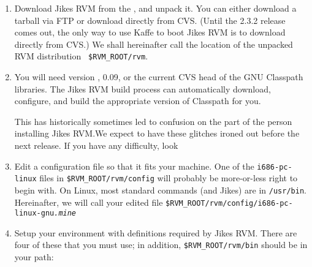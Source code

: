 \begin{enumerate}
We have had mixed experiences with different releases of the Jikes
compiler. Versions 1.13 and 1.18 are known to work for building Jikes
RVM. Versions 1.14 through 1.17 and 1.20 are known to {\em not}\/
work. Version 1.19 has worked for many people, but we have had
problems reported on OSX. 


\begin{small}
{\tt jikes-1.15} in
particular --- installed by default with SuSE Linux 8.1 --- has a
byte-code generation bug that will cause Jikes RVM to crash with an
{\tt ArrayIndexOutOfBounds} exception.  {\tt jikes-1.13}, as of the last
time we tried it (August 8, 2003) works fine, and sometimes generates
better error messages than {\tt jikes-1.18}.
\end{small}

\item Download Jikes RVM from the , and unpack it.   You can either
  download a tarball via FTP or download directly from CVS.  (Until
  the 2.3.2 release comes out, the only way to use Kaffe to boot Jikes
  RVM is to download directly from CVS.)  We shall
hereinafter call the location of the unpacked RVM distribution {\tt
  \$RVM\_\-ROOT\-/\-rvm}.   


%
%
\item You will need version \classpathversion{}, 0.09, or the current
  CVS head of the GNU Classpath
libraries.  The Jikes RVM build process can automatically download, 
configure, and build the appropriate version of Classpath for you.

This has historically sometimes led to confusion on the part of the
person installing Jikes RVM.\@  We expect to have these glitches ironed
out before the next release.  If you have any difficulty, look \AtManualClasspathRootDiscussion{}

\item Edit a configuration file so that it fits your machine.  One of
the {\tt i686-pc-linux} files in {\tt \$RVM\_\-ROOT/rvm/config} will probably be
more-or-less right to begin with.  On Linux, most standard commands
(and Jikes) are in {\tt /usr/bin}.  Hereinafter, we will call your edited
file {\tt \$RVM\_\-ROOT/rvm/config/i686-pc-linux-gnu{\it .mine}}

%
\item Setup your environment with definitions required by Jikes RVM.\@
There are four of these that you must use; in addition,
{\tt \$RVM\_\-ROOT/rvm/bin} should be in your path:


\end{enumerate}
